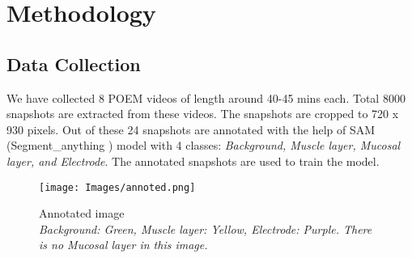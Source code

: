 \section{Methodology}
\label{sec:Methodology}

\subsection{Data Collection}
We have collected 8 POEM videos of length around 40-45 mins each. Total 8000 snapshots are extracted from these videos. The snapshots are cropped to 720 x 930 pixels. Out of these 24 snapshots are annotated with the help of SAM (Segment\_anything \cite{sam-model})  model with 4 classes: \textit{Background, Muscle layer, Mucosal layer, and Electrode}. The annotated snapshots are used to train the model.

\begin{figure}[ht]
    \centering
    \texttt{[image: Images/annoted.png]}
    \caption{Annotated image \\ \textit{Background: Green, Muscle layer: Yellow, Electrode: Purple. There is no Mucosal layer in this image.}}
    \label{fig:annotated}
\end{figure}
